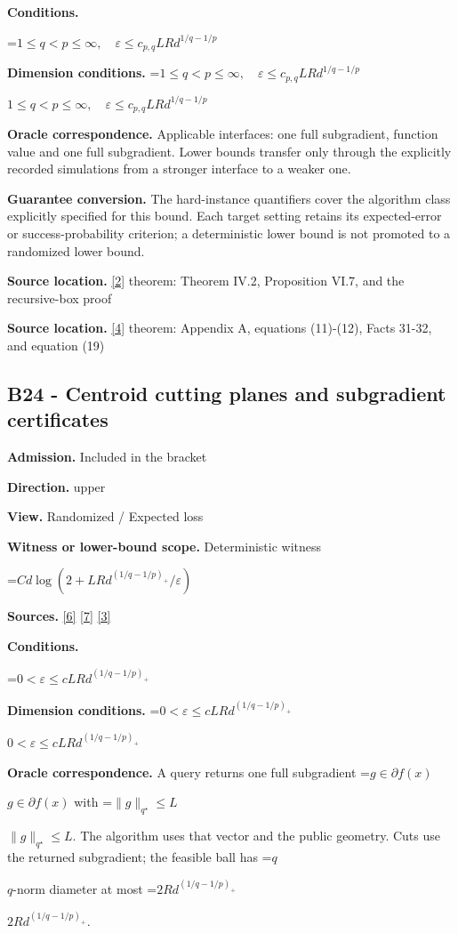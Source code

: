 \documentclass[10pt,a4paper]{article}
\newcommand{\AtlasMath}[1]{\par\begingroup\centering\setbox0=\hbox{$\displaystyle #1$}\ifdim\wd0>1.4\linewidth\typeout{ATLAS WIDE FORMULA: \the\wd0}\fi\ifdim\wd0>\linewidth\resizebox{\linewidth}{!}{\box0}\else\box0\fi\par\endgroup}
\newcommand{\AtlasInlineMath}[1]{\begingroup\setbox0=\hbox{$#1$}\ifdim\wd0>.4\linewidth\endgroup\AtlasMath{#1}\else\endgroup$#1$\fi}
\begin{document}
\textbf{Conditions.} 
\AtlasMath{1\le q<p\le\infty,\quad\varepsilon\le c_{p,q}LRd^{1/q-1/p}}


\textbf{Dimension conditions.} \AtlasInlineMath{1\le q<p\le\infty,\quad\varepsilon\le c_{p,q}LRd^{1/q-1/p}}

\textbf{Oracle correspondence.} Applicable interfaces: one full subgradient, function value and one full subgradient. Lower bounds transfer only through the explicitly recorded simulations from a stronger interface to a weaker one.

\textbf{Guarantee conversion.} The hard-instance quantifiers cover the algorithm class explicitly specified for this bound. Each target setting retains its expected-error or success-probability criterion; a deterministic lower bound is not promoted to a randomized lower bound.

\textbf{Source location.} \href{https://arxiv.org/pdf/1407.5144}{[2]} theorem: Theorem IV.2, Proposition VI.7, and the recursive-box proof

\textbf{Source location.} \href{https://arxiv.org/pdf/2609.20687}{[4]} theorem: Appendix A, equations (11)-(12), Facts 31-32, and equation (19)

\subsection{B24 - Centroid cutting planes and subgradient certificates}
\textbf{Admission.} Included in the bracket

\textbf{Direction.} upper

\textbf{View.} Randomized / Expected loss

\textbf{Witness or lower-bound scope.} Deterministic witness

\AtlasMath{C d\log(2+LRd^{(1/q-1/p)_+}/\varepsilon)}
\textbf{Sources.} \href{https://arxiv.org/pdf/1405.4980}{[6]} \href{https://www2.isye.gatech.edu/~nemirovs/MOR_AccuracyCertificates.pdf}{[7]} \href{https://arxiv.org/pdf/2609.20701}{[3]}

\textbf{Conditions.} 
\AtlasMath{0<\varepsilon\le c LRd^{(1/q-1/p)_+}}


\textbf{Dimension conditions.} \AtlasInlineMath{0<\varepsilon\le c LRd^{(1/q-1/p)_+}}

\textbf{Oracle correspondence.} A query returns one full subgradient \AtlasInlineMath{g\in\partial f(x)} with \AtlasInlineMath{\|g\|_{q^\star}\le L}. The algorithm uses that vector and the public geometry. Cuts use the returned subgradient; the feasible ball has \AtlasInlineMath{q}-norm diameter at most \AtlasInlineMath{2Rd^{(1/q-1/p)_+}}.
\end{document}
